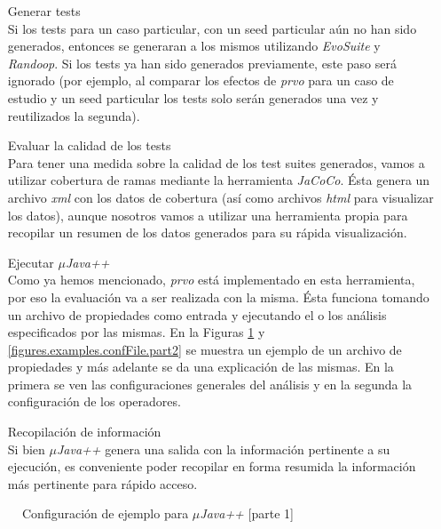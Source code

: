 \begin{enumerate}[leftmargin=.75cm,align=left,style=nextline]
	\item[Generar tests]\mbox{}\\ Si los tests para un caso particular, con un seed particular a\'un no han sido generados, entonces se generaran a los mismos utilizando \emph{EvoSuite} y \emph{Randoop}. Si los tests ya han sido generados previamente, este paso ser\'a ignorado (por ejemplo, al comparar los efectos de \emph{prvo} para un caso de estudio y un seed particular los tests solo ser\'an generados una vez y reutilizados la segunda).
	
	\item[Evaluar la calidad de los tests]\mbox{}\\ Para tener una medida sobre la calidad de los test suites generados, vamos a utilizar cobertura de ramas mediante la herramienta \emph{JaCoCo}. \'Esta genera un archivo \emph{xml} con los datos de cobertura (as\'i como archivos \emph{html} para visualizar los datos), aunque nosotros vamos a utilizar una herramienta propia para recopilar un resumen de los datos generados para su r\'apida visualizaci\'on.
	
	\item[Ejecutar \emph{$\mu$Java++}]\mbox{}\\ Como ya hemos mencionado, \emph{prvo} est\'a implementado en esta herramienta, por eso la evaluaci\'on va a ser realizada con la misma. \'Esta funciona tomando un archivo de propiedades como entrada y ejecutando el o los an\'alisis especificados por las mismas. En la Figuras \ref{figures.examples.confFile.part1} y \ref{figures.examples.confFile.part2} se muestra un ejemplo de un archivo de propiedades y m\'as adelante se da una explicaci\'on de las mismas. En la primera se ven las configuraciones generales del an\'alisis y en la segunda la configuraci\'on de los operadores.
	
	\item[Recopilaci\'on de informaci\'on]\mbox{}\\ Si bien \emph{$\mu$Java++} genera una salida con la informaci\'on pertinente a su ejecuci\'on, es conveniente poder recopilar en forma resumida la informaci\'on m\'as pertinente para r\'apido acceso.
\end{enumerate}

\begin{figure}
	
	\caption{Configuraci\'on de ejemplo para \emph{$\mu$Java++} [parte 1]}
	\label{figures.examples.confFile.part1}
\end{figure}

